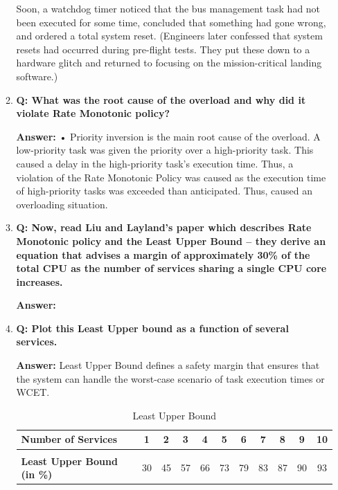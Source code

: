 \documentclass[a4paper,11pt]{article}%
\newenvironment{qanda}{\setlength{\parindent}{0pt}}{\bigskip}
\newcommand{\Q}{\bigskip\bfseries Q: }
\newcommand{\A}{\par\textbf{Answer: } \normalfont}
\begin{document}
\begin{qanda}
\begin{enumerate}
\begin{enumerate}
					  Soon, a watchdog timer noticed that the bus management task had not been executed for some time, concluded that something had gone wrong, and ordered a total system reset. (Engineers later confessed that system resets had occurred during pre-flight tests. They put these down to a hardware glitch and returned to focusing on the mission-critical landing software.)\\
				\item \Q What was the root cause of the overload and why did it violate Rate Monotonic policy?

				      \A
				      • Priority inversion is the main root cause of the overload.
				      A low-priority task was given the priority over a high-priority task. This caused a delay in the high-priority task’s execution time. Thus, a violation of the Rate Monotonic Policy was caused as the execution time of high-priority tasks was exceeded than anticipated. Thus, caused an overloading situation.
				\item \Q Now, read Liu and Layland’s paper which describes Rate Monotonic policy and the Least Upper Bound – they derive an equation that advises a margin of approximately 30\% of the total CPU as the number of services sharing a single CPU core increases.

				\A
				      
				\item \Q Plot this Least Upper bound as a function of several services.

				      \A
				      Least Upper Bound defines a safety margin that ensures that the system can handle the worst-case scenario of task execution times or WCET.

	\begin{table}[H]
	\centering

	\begin{tabular}{l c c c c c c c c c c}
		\hline
		\textbf{Number of Services}&\textbf{1}&\textbf{2}&\textbf{3}&\textbf{4}&\textbf{5}&\textbf{6}&\textbf{7}&\textbf{8}&\textbf{9}&\textbf{10}\\\hline
		&&\\
		\textbf{Least Upper Bound (in \%)}&30&45&57&66&73&79&83&87&90&93\\

\hline\hline
	\end{tabular}
	\caption{Least Upper Bound}
	\label{filterspecs}
\end{table}


\end{enumerate}
\end{enumerate}
\end{qanda}
\end{document}
